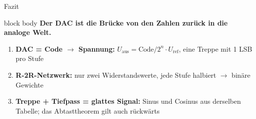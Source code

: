\documentclass[aspectratio=169,11pt]{beamer}
\newif\ifkurzfassung
\newcommand{\kernaussage}[1]{%
  \begin{beamercolorbox}[sep=6pt,rounded=true]{block body}%
  \textbf{#1}\end{beamercolorbox}}
\begin{document}
\newcommand{\praxisfolie}{%
\begin{frame}{DAC in der Praxis \ifkurzfassung{\small\color{grau}(Backup)}\fi}
  \kernaussage{Auflösung (Bit) und Ausgaberate entscheiden – je nach Anwendung 8 bis 24 Bit.}
  \vspace{3mm}
  \begin{itemize}
    \item \textbf{Auflösung}: mehr Bit \(\rightarrow\) feinere Treppe (8 Bit = 256, 16 Bit = \num{65536} Stufen)
    \item \textbf{Ausgaberate}: Werte pro Sekunde \(\rightarrow\) begrenzt die höchste Frequenz
  \end{itemize}
  \vspace{2mm}
  \centering\small
  \begin{tabular}{@{}llll@{}}
    \toprule
    Anwendung & Auflösung & Rate & Bauart\\ \midrule
    ESP32-Mikrocontroller & 8 Bit (2 Kanäle) & einstellbar & mit Cosinus-Generator\\
    Audio-CD-Wiedergabe & 16 Bit & \SI{44.1}{kHz} & meist Sigma-Delta\\
    HiFi-/Studio-Audio & 24 Bit & bis \SI{192}{kHz} & Sigma-Delta\\ \bottomrule
  \end{tabular}\\[3mm]
  {\footnotesize Weitere Bauarten: gewichtete Widerstände (selten), PWM + Tiefpass („Ersatz-DAC“)}
  \note{Bitzahl = Feinheit der Treppe, Ausgaberate = wie schnell sich das Signal ändern kann (Abtasttheorem). ESP32: zwei 8-Bit-DACs + eingebauter Cosinus-Generator. Audio: 24 Bit, meist Sigma-Delta. (Ende 5:00)}
\end{frame}}
\ifkurzfassung\else\praxisfolie\fi

\begin{frame}{Fazit}
  \kernaussage{Der DAC ist die Brücke von den Zahlen zurück in die analoge Welt.}
  \vspace{4mm}
  \begin{enumerate}
    \item \textbf{DAC = Code \(\rightarrow\) Spannung:} \(U_\text{aus} = \text{Code}/2^n\cdot U_\text{ref}\), eine Treppe mit 1 LSB pro Stufe
    \item \textbf{R-2R-Netzwerk:} nur zwei Widerstandswerte, jede Stufe halbiert \(\rightarrow\) binäre Gewichte
    \item \textbf{Treppe + Tiefpass = glattes Signal:} Sinus und Cosinus aus derselben Tabelle; das Abtasttheorem gilt auch rückwärts
  \end{enumerate}
  \vfill{}\vfill
\end{frame}
\end{document}

